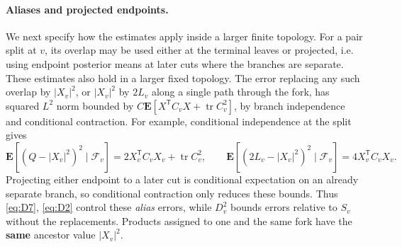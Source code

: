 \paragraph{Aliases and projected endpoints.}
We next specify how the estimates apply inside a larger finite topology. For a pair split at \(v\), its overlap may be used either at the terminal leaves or projected, i.e. using endpoint posterior means at later cuts where the branches are separate. These estimates also hold in a larger fixed topology. The error replacing any such overlap by \(|X_v|^2\), or \(|X_v|^2\) by \(2L_v\) along a single path through the fork, has squared \(L^2\) norm bounded by \(C\mathbf E[X^{\mathsf T} C_v X+\operatorname{tr} C_v^2]\), by branch independence and conditional contraction. For example, conditional independence at the split gives
\[
 \mathbf E[(Q-|X_v|^2)^2\mid\mathcal F_v]
       =2X_v^{\mathsf T}C_vX_v+\operatorname{tr}C_v^2,
 \qquad
 \mathbf E[(2L_v-|X_v|^2)^2\mid\mathcal F_v]
       =4X_v^{\mathsf T}C_vX_v.
\]
Projecting either endpoint to a later cut is conditional expectation
on an already separate branch, so conditional contraction only reduces
these bounds.  Thus \eqref{eq:D7}, \eqref{eq:D2} control these \emph{alias} errors, while \(D_v^2\) bounds errors relative to \(S_v\) without the replacements. Products assigned to one and the same fork have the \textbf{same} ancestor value \(|X_v|^2\).


